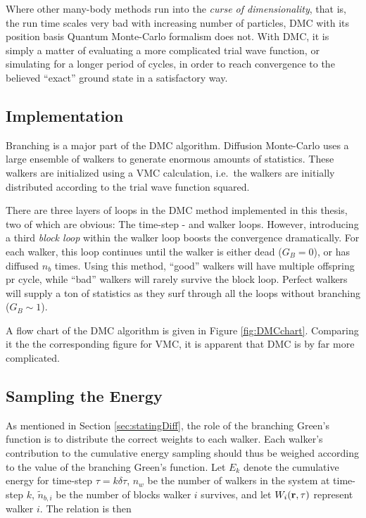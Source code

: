 Where other many-body methods run into the \textit{curse of dimensionality}, that is, the run time scales very bad with increasing number of particles, DMC with its position basis Quantum Monte-Carlo formalism does not. With DMC, it is simply a matter of evaluating a more complicated trial wave function, or simulating for a longer period of cycles, in order to reach convergence to the believed ``exact'' ground state in a satisfactory way.

\subsection{Implementation}

Branching is a major part of the DMC algorithm. Diffusion Monte-Carlo uses a large ensemble of walkers to generate enormous amounts of statistics. These walkers are initialized using a VMC calculation, i.e.~the walkers are initially distributed according to the trial wave function squared. 

There are three layers of loops in the DMC method implemented in this thesis, two of which are obvious: The time-step - and walker loops. However, introducing a third \textit{block loop} within the walker loop boosts the convergence dramatically. For each walker, this loop continues until the walker is either dead ($G_B = 0$), or has diffused $n_b$ times. Using this method, ``good'' walkers will have multiple offspring pr cycle, while ``bad'' walkers will rarely survive the block loop. Perfect walkers will supply a ton of statistics as they surf through all the loops without branching ($G_B \sim 1$).

A flow chart of the DMC algorithm is given in Figure \ref{fig:DMCchart}. Comparing it the the corresponding figure for VMC, it is apparent that DMC is by far more complicated. 

\subsection{Sampling the Energy}

As mentioned in Section \ref{sec:statingDiff}, the role of the branching Green's function is to distribute the correct weights to each walker. Each walker's contribution to the cumulative energy sampling should thus be weighed according to the value of the branching Green's function. Let $E_k$ denote the cumulative energy for time-step $\tau = k\delta\tau$, $n_w$ be the number of walkers in the system at time-step $k$, $\tilde n_{b,i}$ be the number of blocks walker $i$ survives, and let $W_i(\mathbf{r}, \tau)$ represent walker $i$. The relation is then


